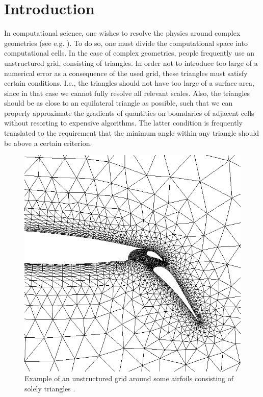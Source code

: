 \section{Introduction}
\label{sec:introduction}
In computational science, one wishes to resolve the physics around complex geometries (see e.g. ).
To do so, one must divide the computational space into computational cells.
In the case of complex geometries, people frequently use an unstructured grid, consisting of triangles.
In order not to introduce too large of a numerical error as a consequence of the used grid, these triangles
must satisfy certain conditions.
I.e., the triangles should not have too large of a surface area,
since in that case we cannot fully resolve all relevant scales.
Also, the triangles should be as close to an equilateral triangle as possible, such that we can
properly approximate the gradients of quantities on boundaries of adjacent cells without resorting to expensive algorithms.
The latter condition is frequently translated to the requirement that the minimum angle
within any triangle should be above a certain criterion.


\begin{figure}[h]
    \centering
    \includegraphics[width=\columnwidth]{../images/airfoil.png}
    \caption{Example of an unstructured grid around some airfoils consisting of solely triangles \cite{img:airfoilImage}.}
    \label{fig:introAirfoil}
\end{figure}

